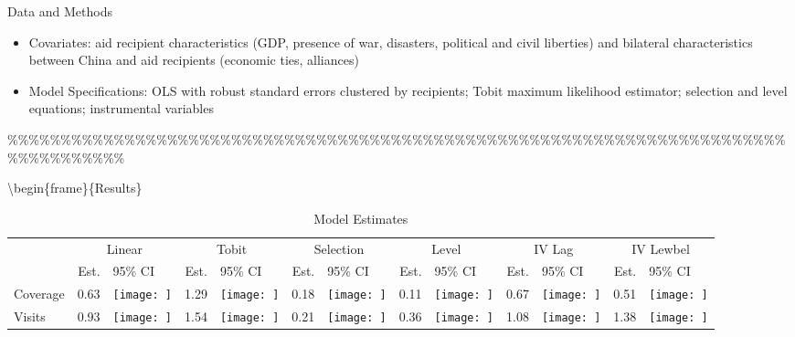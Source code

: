 \documentclass[
  ignorenonframetext,
]{beamer}
\begin{document}
\begin{frame}
\begin{frame}{Data and Methods}
\begin{itemize} 

\item Covariates: aid recipient characteristics (GDP, presence of war, disasters, political and civil liberties) and bilateral characteristics between China and aid recipients (economic ties, alliances)

\item Model Specifications: OLS with robust standard errors clustered by recipients; Tobit maximum likelihood estimator; selection and level equations; instrumental variables

\end{itemize}

\end{frame}

\%\%\%\%\%\%\%\%\%\%\%\%\%\%\%\%\%\%\%\%\%\%\%\%\%\%\%\%\%\%\%\%\%\%\%\%\%\%\%\%\%\%\%\%\%\%\%\%\%\%\%\%\%\%\%\%\%\%\%\%\%\%\%\%\%\%\%\%\%\%\%\%\%\%\%\%\%\%\%\%\%\%\%\%

\textbackslash begin\{frame\}\{Results\}

\begin{table}

\caption{Model Estimates}
\centering
\begin{tabular}[t]{lr>{}lr>{}lr>{}lr>{}lr>{}lr>{}l}
\toprule
\multicolumn{1}{c}{ } & \multicolumn{2}{c}{Linear} & \multicolumn{2}{c}{Tobit} & \multicolumn{2}{c}{Selection} & \multicolumn{2}{c}{Level} & \multicolumn{2}{c}{IV Lag} & \multicolumn{2}{c}{IV Lewbel} \\
\cmidrule(l{3pt}r{3pt}){2-3} \cmidrule(l{3pt}r{3pt}){4-5} \cmidrule(l{3pt}r{3pt}){6-7} \cmidrule(l{3pt}r{3pt}){8-9} \cmidrule(l{3pt}r{3pt}){10-11} \cmidrule(l{3pt}r{3pt}){12-13}
  & Est. & 95\% CI & Est. & 95\% CI & Est. & 95\% CI & Est. & 95\% CI & Est. & 95\% CI & Est. & 95\% CI\\
\midrule
Coverage & 0.63 & \texttt{[image: ]} & 1.29 & \texttt{[image: ]} & 0.18 & \texttt{[image: ]} & 0.11 & \texttt{[image: ]} & 0.67 & \texttt{[image: ]} & 0.51 & \texttt{[image: ]}\\
Visits & 0.93 & \texttt{[image: ]} & 1.54 & \texttt{[image: ]} & 0.21 & \texttt{[image: ]} & 0.36 & \texttt{[image: ]} & 1.08 & \texttt{[image: ]} & 1.38 & \texttt{[image: ]}\\
\bottomrule
\end{tabular}
\end{table}
\end{frame}
\end{document}
